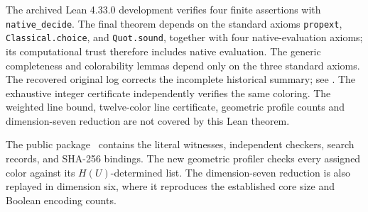 The archived Lean 4.33.0 development verifies four finite assertions with
\texttt{native\_decide}. The final theorem depends on the standard axioms
\texttt{propext}, \texttt{Classical.choice}, and \texttt{Quot.sound}, together
with four native-evaluation axioms; its computational trust therefore includes
native evaluation. The generic completeness and colorability lemmas depend
only on the three standard axioms. The recovered original log corrects the
incomplete historical summary; see .
The exhaustive integer certificate independently verifies the same coloring.
The weighted line bound, twelve-color line certificate, geometric profile
counts and dimension-seven reduction
are not covered by this Lean theorem.

The public package~\cite{Package} contains the literal witnesses, independent
checkers, search records, and SHA-256 bindings. The new geometric profiler
checks every assigned color against its $H(U)$-determined list. The
dimension-seven reduction is also replayed in dimension six, where it
reproduces the established core size and Boolean encoding counts.

